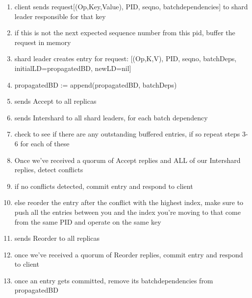 \begin{enumerate}
    \item client sends request[(Op,Key,Value), PID, seqno, batchdependencies] to shard leader responsible for that key
    \item if this is not the next expected sequence number from this pid, buffer the request in memory
    \item shard leader creates entry for request: [(Op,K,V), PID, seqno, batchDeps, initialLD=propagatedBD, newLD=nil]
    \item propagatedBD := append(propagatedBD, batchDeps)
    \item sends Accept to all replicas
    \item sends Intershard to all shard leaders, for each batch dependency
    \item check to see if there are any outstanding buffered entries, if so repeat steps 3-6 for each of these
    \item Once we've received a quorum of Accept replies and ALL of our Intershard replies, detect conflicts
    \item if no conflicts detected, commit entry and respond to client
    \item else reorder the entry after the conflict with the highest index, make sure to push all the entries between you and the index you're moving to that come from the same PID and operate on the same key
    \item sends Reorder to all replicas
    \item once we've received a quorum of Reorder replies, commit entry and respond to client
    \item once an entry gets committed, remove its batchdependencies from propagatedBD
\end{enumerate}


